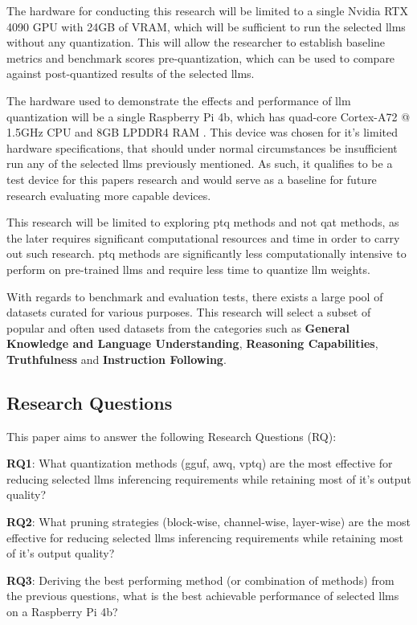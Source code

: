 \documentclass{ifacconf}
\begin{document}
	The hardware for conducting this research will be limited to a single Nvidia RTX 4090 GPU with 24GB of VRAM, which will be sufficient to run the selected \glspl{llm} without any quantization. This will allow the researcher to establish baseline metrics and benchmark scores pre-quantization, which can be used to compare against post-quantized results of the selected \glspl{llm}.
	
	The hardware used to demonstrate the effects and performance of \gls{llm} quantization will be a single Raspberry Pi 4b, which has quad-core Cortex-A72 @ 1.5GHz CPU and 8GB LPDDR4 RAM \cite{raspberrypi4}. This device was chosen for it's limited hardware specifications, that should under normal circumstances be insufficient run any of the selected \glspl{llm} previously mentioned. As such, it qualifies to be a test device for this papers research and would serve as a baseline for future research evaluating more capable devices.
	
	This research will be limited to exploring \gls{ptq} methods and not \gls{qat} methods, as the later requires significant computational resources and time in order to carry out such research. \gls{ptq} methods are significantly less computationally intensive to perform on pre-trained \glspl{llm} and require less time to quantize \gls{llm} weights.
	
	With regards to benchmark and evaluation tests, there exists a large pool of datasets curated for various purposes. This research will select a subset of popular and often used datasets from the categories such as \textbf{General Knowledge and Language Understanding}, \textbf{Reasoning Capabilities}, \textbf{Truthfulness} and \textbf{Instruction Following}.
	
	\subsection{Research Questions}
	This paper aims to answer the following Research Questions (RQ):
	
	\textbf{RQ1}: What quantization methods (\gls{gguf}, \gls{awq}, \gls{vptq}) are the most effective for reducing selected \glspl{llm} inferencing requirements while retaining most of it's output quality?
	
	\textbf{RQ2}: What pruning strategies (block-wise, channel-wise, layer-wise) are the most effective for reducing selected \glspl{llm} inferencing requirements while retaining most of it's output quality?
	
	\textbf{RQ3}: Deriving the best performing method (or combination of methods) from the previous questions, what is the best achievable performance of selected \glspl{llm} on a Raspberry Pi 4b?
	
\end{document}

